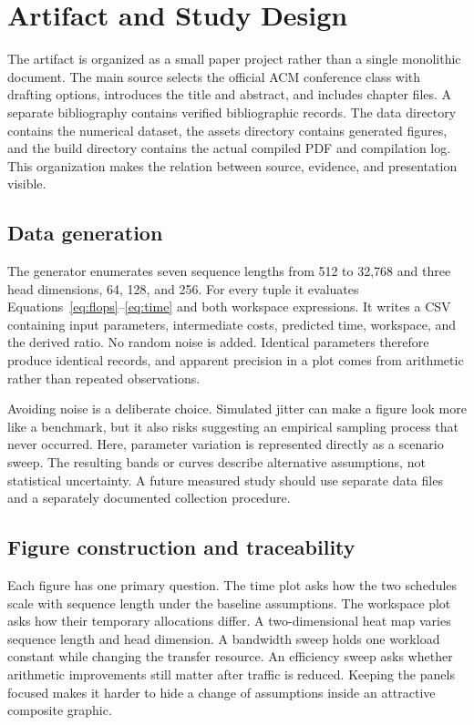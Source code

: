 \section{Artifact and Study Design}
\label{sec:design}
The artifact is organized as a small paper project rather than a single monolithic document. The main source selects the official ACM conference class with drafting options, introduces the title and abstract, and includes chapter files. A separate bibliography contains verified bibliographic records. The data directory contains the numerical dataset, the assets directory contains generated figures, and the build directory contains the actual compiled PDF and compilation log. This organization makes the relation between source, evidence, and presentation visible.

\subsection{Data generation}
The generator enumerates seven sequence lengths from 512 to 32,768 and three head dimensions, 64, 128, and 256. For every tuple it evaluates Equations~\ref{eq:flops}--\ref{eq:time} and both workspace expressions. It writes a CSV containing input parameters, intermediate costs, predicted time, workspace, and the derived ratio. No random noise is added. Identical parameters therefore produce identical records, and apparent precision in a plot comes from arithmetic rather than repeated observations.

Avoiding noise is a deliberate choice. Simulated jitter can make a figure look more like a benchmark, but it also risks suggesting an empirical sampling process that never occurred. Here, parameter variation is represented directly as a scenario sweep. The resulting bands or curves describe alternative assumptions, not statistical uncertainty. A future measured study should use separate data files and a separately documented collection procedure.

\subsection{Figure construction and traceability}
Each figure has one primary question. The time plot asks how the two schedules scale with sequence length under the baseline assumptions. The workspace plot asks how their temporary allocations differ. A two-dimensional heat map varies sequence length and head dimension. A bandwidth sweep holds one workload constant while changing the transfer resource. An efficiency sweep asks whether arithmetic improvements still matter after traffic is reduced. Keeping the panels focused makes it harder to hide a change of assumptions inside an attractive composite graphic.

